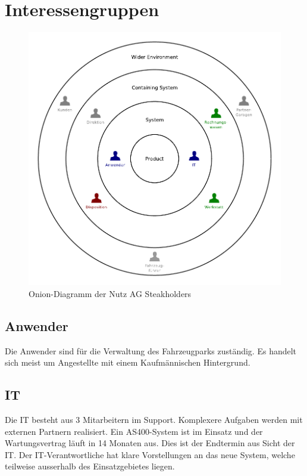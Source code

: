 \section{Interessengruppen}

\begin{center}
  \begin{figure}[ht]
    \includegraphics{graphics/onion.pdf}
    \caption{Onion-Diagramm der Nutz AG Steakholders}
    \label{fig:awesome_image}
  \end{figure}
\end{center}

\newpage
\subsection{Anwender}
Die Anwender sind für die Verwaltung des Fahrzeugparks zuständig. Es handelt sich meist um Angestellte mit einem Kaufmännischen Hintergrund. 


\subsection{IT}
Die IT besteht aus 3 Mitarbeitern im Support. Komplexere Aufgaben werden mit externen Partnern realisiert. Ein AS400-System ist im Einsatz und der Wartungsvertrag läuft in 14 Monaten aus. Dies ist der Endtermin aus Sicht der IT. Der IT-Verantwortliche hat klare Vorstellungen an das neue System, welche teilweise ausserhalb des Einsatzgebietes liegen. 

